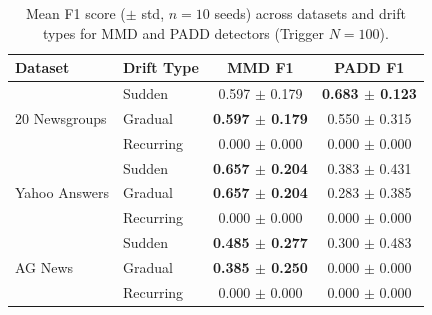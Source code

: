 \begin{table}[htbp]
  \centering
  \caption{Mean F1 score ($\pm$ std, $n=10$ seeds) across datasets and
           drift types for MMD and PADD detectors (Trigger $N=100$).}
  \label{tab:cross_dataset_f1}
  \begin{tabular}{llcc}
    \toprule
    \textbf{Dataset} & \textbf{Drift Type}
      & \textbf{MMD F1} & \textbf{PADD F1} \\
    \midrule
    \multirow{3}{*}{20 Newsgroups} & Sudden & 0.597 $\pm$ 0.179 & \textbf{0.683 $\pm$ 0.123} \\
     & Gradual & \textbf{0.597 $\pm$ 0.179} & 0.550 $\pm$ 0.315 \\
     & Recurring & 0.000 $\pm$ 0.000 & 0.000 $\pm$ 0.000 \\
    \midrule
    \multirow{3}{*}{Yahoo Answers} & Sudden & \textbf{0.657 $\pm$ 0.204} & 0.383 $\pm$ 0.431 \\
     & Gradual & \textbf{0.657 $\pm$ 0.204} & 0.283 $\pm$ 0.385 \\
     & Recurring & 0.000 $\pm$ 0.000 & 0.000 $\pm$ 0.000 \\
    \midrule
    \multirow{3}{*}{AG News} & Sudden & \textbf{0.485 $\pm$ 0.277} & 0.300 $\pm$ 0.483 \\
     & Gradual & \textbf{0.385 $\pm$ 0.250} & 0.000 $\pm$ 0.000 \\
     & Recurring & 0.000 $\pm$ 0.000 & 0.000 $\pm$ 0.000 \\
    \bottomrule
  \end{tabular}
\end{table}
